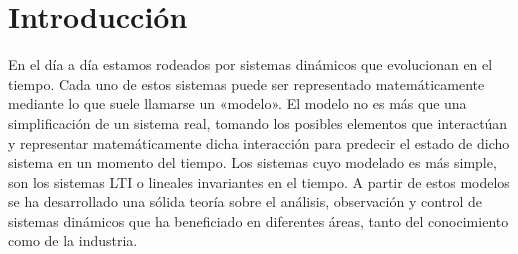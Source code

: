 \section{Introducci\'on}
En el día a día estamos rodeados por sistemas dinámicos que
evolucionan en el tiempo.
Cada uno de estos sistemas puede ser representado matemáticamente
mediante lo que suele llamarse un «modelo».
El modelo no es más que una simplificación de un sistema real,
tomando los posibles elementos que interactúan y representar
matemáticamente dicha interacción para predecir el estado de dicho
sistema en un momento del tiempo.
Los sistemas cuyo modelado es más simple, son los sistemas LTI
o lineales invariantes en el tiempo.
A partir de estos modelos se ha desarrollado una sólida teoría sobre
el análisis, observación y control de sistemas dinámicos que ha beneficiado
en diferentes áreas, tanto del conocimiento como de la industria.

